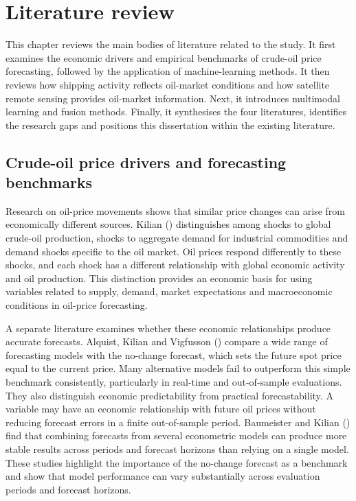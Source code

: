 \documentclass[
  british,
  12pt,
  oneside]{book}
\begin{document}
\chapter{Literature review}\label{literature}

This chapter reviews the main bodies of literature related to the study. It first examines the economic drivers and empirical benchmarks of crude-oil price forecasting, followed by the application of machine-learning methods. It then reviews how shipping activity reflects oil-market conditions and how satellite remote sensing provides oil-market information. Next, it introduces multimodal learning and fusion methods. Finally, it synthesises the four literatures, identifies the research gaps and positions this dissertation within the existing literature.

\section{Crude-oil price drivers and forecasting benchmarks}\label{lit-benchmarks}

Research on oil-price movements shows that similar price changes can arise from economically different sources. Kilian () distinguishes among shocks to global crude-oil production, shocks to aggregate demand for industrial commodities and demand shocks specific to the oil market. Oil prices respond differently to these shocks, and each shock has a different relationship with global economic activity and oil production. This distinction provides an economic basis for using variables related to supply, demand, market expectations and macroeconomic conditions in oil-price forecasting.

A separate literature examines whether these economic relationships produce accurate forecasts. Alquist, Kilian and Vigfusson () compare a wide range of forecasting models with the no-change forecast, which sets the future spot price equal to the current price. Many alternative models fail to outperform this simple benchmark consistently, particularly in real-time and out-of-sample evaluations. They also distinguish economic predictability from practical forecastability. A variable may have an economic relationship with future oil prices without reducing forecast errors in a finite out-of-sample period. Baumeister and Kilian () find that combining forecasts from several econometric models can produce more stable results across periods and forecast horizons than relying on a single model. These studies highlight the importance of the no-change forecast as a benchmark and show that model performance can vary substantially across evaluation periods and forecast horizons.
\end{document}
